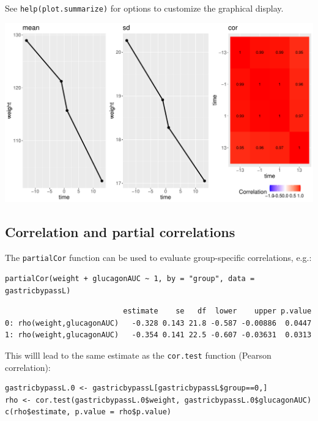 \documentclass[12pt]{article}
\begin{document}
See \texttt{help(plot.summarize)} for options to customize the graphical
display.

\begin{center}
\includegraphics[trim={0 0 0 0},width=1\textwidth]{./figures/summarize.pdf}
\end{center}

\clearpage

\subsection{Correlation and partial correlations}
\label{sec:org9fe2eeb}

The \texttt{partialCor} function can be used to evaluate group-specific
correlations, e.g.:
\lstset{language=r,label= ,caption= ,captionpos=b,numbers=none}
\begin{lstlisting}
partialCor(weight + glucagonAUC ~ 1, by = "group", data = gastricbypassL)
\end{lstlisting}

\begin{verbatim}
                           estimate    se   df  lower    upper p.value
0: rho(weight,glucagonAUC)   -0.328 0.143 21.8 -0.587 -0.00886  0.0447
1: rho(weight,glucagonAUC)   -0.354 0.141 22.5 -0.607 -0.03631  0.0313
\end{verbatim}


This willl lead to the same estimate as the \texttt{cor.test} function
(Pearson correlation):
\lstset{language=r,label= ,caption= ,captionpos=b,numbers=none}
\begin{lstlisting}
gastricbypassL.0 <- gastricbypassL[gastricbypassL$group==0,]
rho <- cor.test(gastricbypassL.0$weight, gastricbypassL.0$glucagonAUC)
c(rho$estimate, p.value = rho$p.value)
\end{lstlisting}
\end{document}

